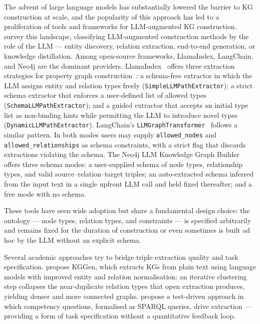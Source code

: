 The advent of large language models has substantially lowered the barrier to KG
construction at scale, and the popularity of this approach has led to a proliferation of tools and frameworks for LLM-augmented KG construction.
\citet{pan2024llmkg} survey this landscape, classifying LLM-augmented construction methods
by the role of the LLM --- entity discovery, relation extraction, end-to-end generation, or
knowledge distillation. Among open-source frameworks, LlamaIndex, LangChain, and Neo4j are the dominant providers.
LlamaIndex~\citep{liu2022llamaindex} offers three extraction strategies for property graph
construction~\citep{llamaindex2024propertygraph}: a schema-free extractor in which the LLM
assigns entity and relation types freely (\texttt{SimpleLLMPathExtractor}); a strict schema
extractor that enforces a user-defined list of allowed types
(\texttt{SchemaLLMPathExtractor}); and a guided extractor that accepts an initial type list
as non-binding hints while permitting the LLM to introduce novel types
(\texttt{DynamicLLMPathExtractor}).
LangChain's \texttt{LLMGraphTransformer}~\citep{chase2022langchain,
bratanic2024llmgraphtransformer} follows a similar pattern.
In both modes users may supply \texttt{allowed\_nodes} and \texttt{allowed\_relationships}
as schema constraints, with a strict flag that discards extractions violating the schema.
The Neo4j LLM Knowledge Graph Builder~\citep{neo4j2024llmgraphbuilder,
neo4jdocs2024kgbuilder} offers three schema modes: a user-supplied schema of node types,
relationship types, and valid source--relation--target triples; an auto-extracted schema
inferred from the input text in a single upfront LLM call and held fixed thereafter; and a
free mode with no schema.

These tools have seen wide adoption but share a fundamental design choice: the ontology
--- node types, relation types, and constraints --- is specified arbitrarily and remains fixed for
the duration of construction or even sometimes is built ad hoc by the LLM without an explicit schema.

Several academic approaches try to bridge triple extraction quality and task specification.
\citet{mo2025kggen} propose KGGen, which extracts KGs from plain text using language models
with improved entity and relation normalisation: an iterative clustering step collapses the
near-duplicate relation types that open extraction produces, yielding denser and more
connected graphs.
\citet{mynarz2023testdriven} propose a test-driven approach in which competency questions,
formalised as SPARQL queries, drive extraction --- providing a
form of task specification without a quantitative feedback loop.

